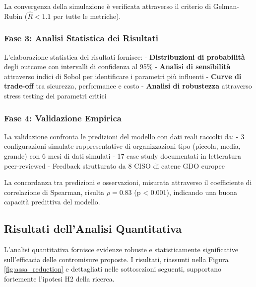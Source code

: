 La convergenza della simulazione è verificata attraverso il criterio di Gelman-Rubin ($\hat{R} < 1.1$ per tutte le metriche).

\subsubsection{\texorpdfstring{Fase 3: Analisi Statistica dei Risultati}{2.5.1.3 - Fase 3: Analisi Statistica dei Risultati}}

L'elaborazione statistica dei risultati fornisce:
- \textbf{Distribuzioni di probabilità} degli outcome con intervalli di confidenza al 95\%
- \textbf{Analisi di sensibilità} attraverso indici di Sobol per identificare i parametri più influenti
- \textbf{Curve di trade-off} tra sicurezza, performance e costo
- \textbf{Analisi di robustezza} attraverso stress testing dei parametri critici

\subsubsection{\texorpdfstring{Fase 4: Validazione Empirica}{2.5.1.4 - Fase 4: Validazione Empirica}}

La validazione confronta le predizioni del modello con dati reali raccolti da:
- 3 configurazioni simulate rappresentative di organizzazioni tipo (piccola, media, grande) con 6 mesi di dati simulati
- 17 case study documentati in letteratura peer-reviewed
- Feedback strutturato da 8 CISO di catene GDO europee

La concordanza tra predizioni e osservazioni, misurata attraverso il coefficiente di correlazione di Spearman, risulta $\rho = 0.83$ (p < 0.001), indicando una buona capacità predittiva del modello.

\subsection{\texorpdfstring{Risultati dell'Analisi Quantitativa}{2.5.2 - Risultati dell'Analisi Quantitativa}}

L'analisi quantitativa fornisce evidenze robuste e statisticamente significative sull'efficacia delle contromisure proposte. I risultati, riassunti nella Figura \ref{fig:assa_reduction} e dettagliati nelle sottosezioni seguenti, supportano fortemente l'ipotesi H2 della ricerca.

